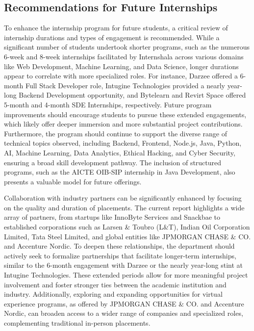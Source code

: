\documentclass[11pt,a4paper]{article}
\newenvironment{card}{
    \begin{tcolorbox}[
        enhanced,
        colback=cardback,
        colframe=border,
        sharp corners,
        boxrule=0.5pt,
        drop shadow,
        drop shadow={shadow xshift=1mm,shadow yshift=-1mm,fill=border!50},
        boxsep=3mm,
        left=5mm, right=5mm, top=5mm, bottom=5mm,
        width=\textwidth,
        nobeforeafter
    ]
}{\end{tcolorbox}}
\begin{document}
\begin{card}
    \subsection*{\textcolor{accent}{Recommendations for Future Internships}}
    \vspace{0.3cm}
    To enhance the internship program for future students, a critical review of internship durations and types of engagement is recommended. While a significant number of students undertook shorter programs, such as the numerous 6-week and 8-week internships facilitated by Internshala across various domains like Web Development, Machine Learning, and Data Science, longer durations appear to correlate with more specialized roles. For instance, Darzee offered a 6-month Full Stack Developer role, Intugine Technologies provided a nearly year-long Backend Development opportunity, and Bytelearn and Revirt Space offered 5-month and 4-month SDE Internships, respectively. Future program improvements should encourage students to pursue these extended engagements, which likely offer deeper immersion and more substantial project contributions. Furthermore, the program should continue to support the diverse range of technical topics observed, including Backend, Frontend, Node.js, Java, Python, AI, Machine Learning, Data Analytics, Ethical Hacking, and Cyber Security, ensuring a broad skill development pathway. The inclusion of structured programs, such as the AICTE OIB-SIP internship in Java Development, also presents a valuable model for future offerings.

    Collaboration with industry partners can be significantly enhanced by focusing on the quality and duration of placements. The current report highlights a wide array of partners, from startups like InnoByte Services and Snackbae to established corporations such as Larsen \& Toubro (L\&T), Indian Oil Corporation Limited, Tata Steel Limited, and global entities like JPMORGAN CHASE \& CO. and Accenture Nordic. To deepen these relationships, the department should actively seek to formalize partnerships that facilitate longer-term internships, similar to the 6-month engagement with Darzee or the nearly year-long stint at Intugine Technologies. These extended periods allow for more meaningful project involvement and foster stronger ties between the academic institution and industry. Additionally, exploring and expanding opportunities for virtual experience programs, as offered by JPMORGAN CHASE \& CO. and Accenture Nordic, can broaden access to a wider range of companies and specialized roles, complementing traditional in-person placements.


\end{card}
\end{document}
